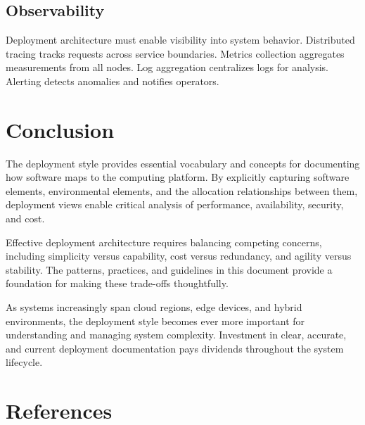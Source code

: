 \documentclass[11pt]{article}
\begin{document}
\subsection{Observability}

Deployment architecture must enable visibility into system behavior. Distributed tracing tracks requests across service boundaries. Metrics collection aggregates measurements from all nodes. Log aggregation centralizes logs for analysis. Alerting detects anomalies and notifies operators.

\section{Conclusion}

The deployment style provides essential vocabulary and concepts for documenting how software maps to the computing platform. By explicitly capturing software elements, environmental elements, and the allocation relationships between them, deployment views enable critical analysis of performance, availability, security, and cost.

Effective deployment architecture requires balancing competing concerns, including simplicity versus capability, cost versus redundancy, and agility versus stability. The patterns, practices, and guidelines in this document provide a foundation for making these trade-offs thoughtfully.

As systems increasingly span cloud regions, edge devices, and hybrid environments, the deployment style becomes ever more important for understanding and managing system complexity. Investment in clear, accurate, and current deployment documentation pays dividends throughout the system lifecycle.

\section*{References}
\end{document}
